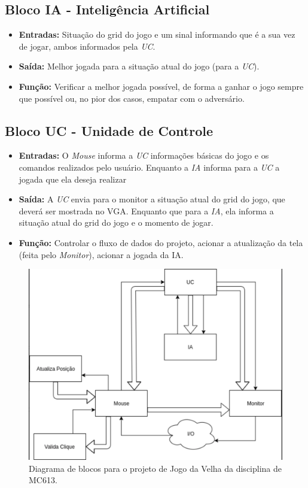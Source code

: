 \documentclass{article}
\begin{document}
    \subsection{Bloco IA - Inteligência Artificial}
        \begin{itemize}
            \item \textbf{Entradas:} Situação do grid do jogo e um sinal informando que é a sua vez de jogar, ambos informados pela \emph{UC}.
            \item \textbf{Saída:} Melhor jogada para a situação atual do jogo (para a \emph{UC}).
            \item \textbf{Função:} Verificar a melhor jogada possível, de forma a ganhar o jogo sempre que possível ou, no pior dos casos, empatar com o adversário.
        \end{itemize}

    \subsection{Bloco UC - Unidade de Controle}
        \begin{itemize}
            \item \textbf{Entradas:} O \emph{Mouse} informa a \emph{UC} informações básicas do jogo e os comandos realizados pelo usuário. Enquanto a \emph{IA} informa para a \emph{UC} a jogada que ela deseja realizar
            \item \textbf{Saída:} A \emph{UC} envia para o monitor a situação atual do grid do jogo, que deverá ser mostrada no VGA. Enquanto que para a \emph{IA}, ela informa a situação atual do grid do jogo e o momento de jogar.
            \item \textbf{Função:} Controlar o fluxo de dados do projeto, acionar a atualização da tela (feita pelo \emph{Monitor}), acionar a jogada da IA.
        \end{itemize}

\begin{figure}[h!]
    \centering
    \includegraphics[scale=0.7]{diagrama.png}
    \caption{\label{fig:diagrama}Diagrama de blocos para o projeto de Jogo da Velha da disciplina de MC613.}
\end{figure}


\nocite{*}


\end{document}
